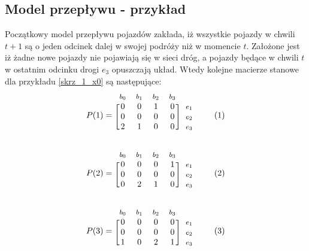 \documentclass[12pt]{book}
\newcommand\addtag{\refstepcounter{equation}
\tag{\theequation}}
\begin{document}
\subsection{Model przepływu - przykład}
Początkowy model przepływu pojazdów zakłada, iż wszystkie pojazdy w chwili $t+1$ są o jeden odcinek dalej w swojej podróży niż w momencie $t$. Założone jest iż żadne nowe pojazdy nie pojawiają się w sieci dróg, a pojazdy będące w chwili $t$ w ostatnim odcinku drogi $e_3$ opuszczają układ. Wtedy kolejne macierze stanowe dla przykładu \ref{skrz_1_x0} są następujące:
\begin{equation*}
  P(1)=
  \begin{blockarray}{*{4}{c} l}
    \begin{block}{*{4}{>{$\footnotesize}c<{$}} l}
      $b_0$ & $b_1$  & $b_2$ & $b_3$ \\
    \end{block}
    \begin{block}{[*{4}{c}]>{$\footnotesize}l<{$}}
       0 & 0 & 1 & 0 & $e_1$ \\
       0 & 0 & 0 & 0 & $e_2$ \\
       2 & 1 & 0 & 0 & $e_3$ \\
    \end{block}
  \end{blockarray} \addtag
\end{equation*}

\begin{equation*}
  P(2)=
  \begin{blockarray}{*{4}{c} l}
    \begin{block}{*{4}{>{$\footnotesize}c<{$}} l}
      $b_0$ & $b_1$ & $b_2$ & $b_3$  \\
    \end{block}
    \begin{block}{[*{4}{c}]>{$\footnotesize}l<{$}}
       0 & 0 & 0 & 1 & $e_1$ \\
       0 & 0 & 0 & 0 & $e_2$ \\
       0 & 2 & 1 & 0 & $e_3$ \\
    \end{block}
  \end{blockarray} \addtag
\end{equation*}


\begin{equation*}
  P(3)=
  \begin{blockarray}{*{4}{c} l}
    \begin{block}{*{4}{>{$\footnotesize}c<{$}} l}
      $b_0$ & $b_1$ & $b_2$ & $b_3$ \\
    \end{block}
    \begin{block}{[*{4}{c}]>{$\footnotesize}l<{$}}
       0 & 0 & 0 & 0 & $e_1$ \\
       0 & 0 & 0 & 0 & $e_2$ \\
       1 & 0 & 2 & 1 & $e_3$ \\
    \end{block}
  \end{blockarray} \addtag
\end{equation*}
\end{document}
